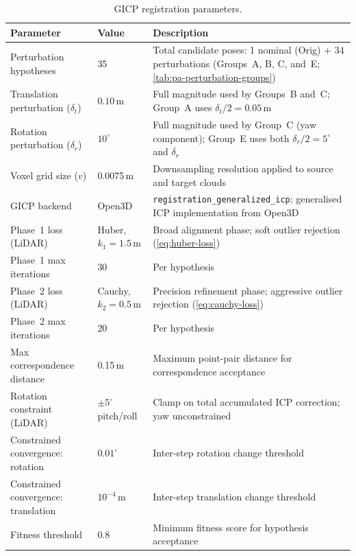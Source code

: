 \begin{table}[htbp]
  \centering
  \caption{GICP registration parameters.}
  \label{tab:pa-icp-params}
  \begin{tabularx}{\textwidth}{@{} >{\raggedright}p{} >{\raggedright}p{} >{\raggedright\arraybackslash}X @{}}
    \toprule
    \textbf{Parameter} & \textbf{Value} & \textbf{Description} \\
    \midrule
    Perturbation hypotheses         & 35                  & Total candidate poses: 1 nominal (Orig) + 34 perturbations (Groups~A, B, C, and~E; \cref{tab:pa-perturbation-groups}) \\
    Translation perturbation ($\delta_t$) & $0.10$\,m & Full magnitude used by Groups~B and~C; Group~A uses $\delta_t / 2 = 0.05$\,m \\
    Rotation perturbation ($\delta_r$)    & $10^{\circ}$ & Full magnitude used by Group~C (yaw component); Group~E uses both $\delta_r / 2 = 5^{\circ}$ and $\delta_r$ \\
    Voxel grid size ($v$)           & 0.0075\,m           & Downsampling resolution applied to source and target clouds \\
    GICP backend                    & Open3D              & \texttt{registration\_generalized\_icp}; generalised ICP implementation from Open3D~\cite{zhouOpen3DModernLibrary2018} \\
    Phase~1 loss (LiDAR)            & Huber, $k_1 = 1.5$\,m & Broad alignment phase; soft outlier rejection (\cref{eq:huber-loss}) \\
    Phase~1 max iterations          & 30                  & Per hypothesis \\
    Phase~2 loss (LiDAR)            & Cauchy, $k_2 = 0.5$\,m & Precision refinement phase; aggressive outlier rejection (\cref{eq:cauchy-loss}) \\
    Phase~2 max iterations          & 20                  & Per hypothesis \\
    Max correspondence distance     & 0.15\,m             & Maximum point-pair distance for correspondence acceptance \\
    Rotation constraint (LiDAR)     & $\pm 5^{\circ}$ pitch/roll & Clamp on total accumulated ICP correction; yaw unconstrained \\
    Constrained convergence: rotation    & $0.01^{\circ}$ & Inter-step rotation change threshold \\
    Constrained convergence: translation & $10^{-4}$\,m   & Inter-step translation change threshold \\
    Fitness threshold               & 0.8                 & Minimum fitness score for hypothesis acceptance \\
    \bottomrule
  \end{tabularx}
\end{table}

